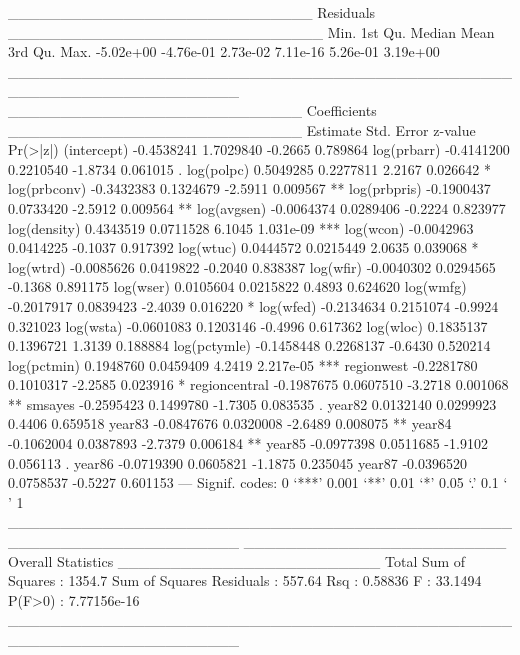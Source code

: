 \documentclass{article}
\begin{document}
\begin{Schunk}
\begin{Soutput}
_____________________________ Residuals ______________________________
     Min.   1st Qu.    Median      Mean   3rd Qu.      Max. 
-5.02e+00 -4.76e-01  2.73e-02  7.11e-16  5.26e-01  3.19e+00 
______________________________________________________________________ 
____________________________ Coefficients ____________________________
                Estimate Std. Error z-value  Pr(>|z|)    
(intercept)   -0.4538241  1.7029840 -0.2665  0.789864    
log(prbarr)   -0.4141200  0.2210540 -1.8734  0.061015 .  
log(polpc)     0.5049285  0.2277811  2.2167  0.026642 *  
log(prbconv)  -0.3432383  0.1324679 -2.5911  0.009567 ** 
log(prbpris)  -0.1900437  0.0733420 -2.5912  0.009564 ** 
log(avgsen)   -0.0064374  0.0289406 -0.2224  0.823977    
log(density)   0.4343519  0.0711528  6.1045 1.031e-09 ***
log(wcon)     -0.0042963  0.0414225 -0.1037  0.917392    
log(wtuc)      0.0444572  0.0215449  2.0635  0.039068 *  
log(wtrd)     -0.0085626  0.0419822 -0.2040  0.838387    
log(wfir)     -0.0040302  0.0294565 -0.1368  0.891175    
log(wser)      0.0105604  0.0215822  0.4893  0.624620    
log(wmfg)     -0.2017917  0.0839423 -2.4039  0.016220 *  
log(wfed)     -0.2134634  0.2151074 -0.9924  0.321023    
log(wsta)     -0.0601083  0.1203146 -0.4996  0.617362    
log(wloc)      0.1835137  0.1396721  1.3139  0.188884    
log(pctymle)  -0.1458448  0.2268137 -0.6430  0.520214    
log(pctmin)    0.1948760  0.0459409  4.2419 2.217e-05 ***
regionwest    -0.2281780  0.1010317 -2.2585  0.023916 *  
regioncentral -0.1987675  0.0607510 -3.2718  0.001068 ** 
smsayes       -0.2595423  0.1499780 -1.7305  0.083535 .  
year82         0.0132140  0.0299923  0.4406  0.659518    
year83        -0.0847676  0.0320008 -2.6489  0.008075 ** 
year84        -0.1062004  0.0387893 -2.7379  0.006184 ** 
year85        -0.0977398  0.0511685 -1.9102  0.056113 .  
year86        -0.0719390  0.0605821 -1.1875  0.235045    
year87        -0.0396520  0.0758537 -0.5227  0.601153    
---
Signif. codes:  0 ‘***’ 0.001 ‘**’ 0.01 ‘*’ 0.05 ‘.’ 0.1 ‘ ’ 1 
______________________________________________________________________ 
_________________________ Overall Statistics _________________________
Total Sum of Squares       : 1354.7
Sum of Squares Residuals   : 557.64
Rsq                        : 0.58836
F                          : 33.1494
P(F>0)                     : 7.77156e-16
______________________________________________________________________ 
\end{Soutput}
\end{Schunk}
\end{document}
